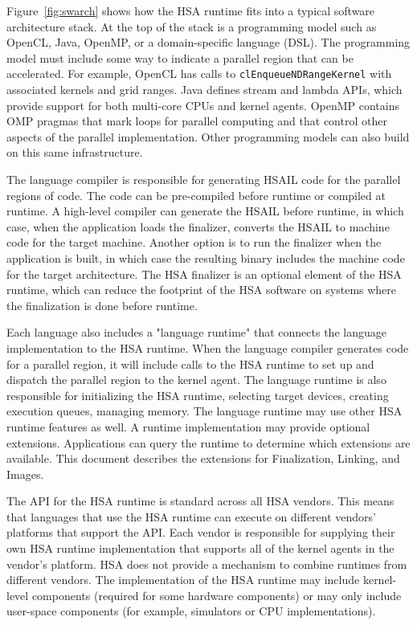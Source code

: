 \documentclass[oneside]{book}
\begin{document}
Figure~\ref{fig:swarch} shows how the HSA runtime fits into a typical software
architecture stack. At the top of the stack is a programming model such as
OpenCL\texttrademark, Java, OpenMP, or a domain-specific language (DSL). The
programming model must include some way to indicate a parallel region that can
be accelerated. For example, OpenCL has calls to \texttt{clEnqueueNDRangeKernel}
with associated kernels and grid ranges. Java defines stream and lambda APIs,
which provide support for both multi-core CPUs and kernel agents. OpenMP
contains OMP pragmas that mark loops for parallel computing and that control
other aspects of the parallel implementation. Other programming models can also
build on this same infrastructure.

The language compiler is responsible for generating HSAIL code for the parallel
regions of code. The code can be pre-compiled before runtime or compiled at
runtime. A high-level compiler can generate the HSAIL before runtime, in which
case, when the application loads the finalizer, converts the HSAIL to machine
code for the target machine. Another option is to run the finalizer when the
application is built, in which case the resulting binary includes the machine
code for the target architecture. The HSA finalizer is an optional element of
the HSA runtime, which can reduce the footprint of the HSA software on systems
where the finalization is done before runtime.

Each language also includes a "language runtime" that connects the language
implementation to the HSA runtime. When the language compiler generates code for
a parallel region, it will include calls to the HSA runtime to set up and
dispatch the parallel region to the kernel agent. The language runtime is also
responsible for initializing the HSA runtime, selecting target devices, creating
execution queues, managing memory. The language runtime may use other HSA
runtime features as well. A runtime implementation may provide optional
extensions. Applications can query the runtime to determine which extensions are
available. This document describes the extensions for Finalization, Linking, and
Images.

The API for the HSA runtime is standard across all HSA vendors. This means that
languages that use the HSA runtime can execute on different vendors' platforms
that support the API. Each vendor is responsible for supplying their own HSA
runtime implementation that supports all of the kernel agents in the vendor's
platform. HSA does not provide a mechanism to combine runtimes from different
vendors. The implementation of the HSA runtime may include kernel-level
components (required for some hardware components) or may only include
user-space components (for example, simulators or CPU implementations).
\end{document}
